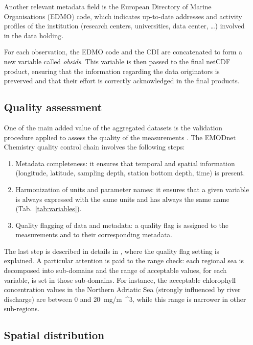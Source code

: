 \documentclass[essd, manuscript]{copernicus}
\begin{document}
Another relevant metadata field is the European Directory of Marine Organisations (EDMO) code, which indicates up-to-date addresses and activity profiles of the institution (research centers, universities, data center, \ldots) involved in the data holding. 

For each observation, the EDMO code and the CDI are concatenated to form a new variable called \textit{obsids}. This variable is then passed to the final netCDF product, ensuring that the information regarding the data originators is preverved and that their effort is correctly acknowledged in the final products. 

\subsection{Quality assessment\label{sec:dataqualitycontrol}}

One of the main added value of the aggregated datasets is the validation procedure applied to assess the quality of the measurements \citep{Barth2015,Lipizer2021,Lipizer2023}. The EMODnet Chemistry quality control chain involves the following steps:
\begin{enumerate}
\item Metadata completeness: it ensures that temporal and spatial information (longitude, latitude, sampling depth, station bottom depth, time) is present.
\item Harmonization of units and parameter names: it ensures that a given variable is always expressed with the same units and has always the same name (Tab.~\ref{tab:variables}). 
\item Quality flagging of data and metadata: a quality flag is assigned to the measurements and to their corresponding metadata.
\end{enumerate} 
The last step is described in details in \citet{Lipizer2023}, where the quality flag setting is explained. A particular attention is paid to the range check: each regional sea is decomposed into sub-domains and the range of acceptable values, for each variable, is set in those sub-domains. For instance, the acceptable chlorophyll concentration values in the Northern Adriatic Sea (strongly influenced by river discharge) are between 0 and 20~\unit{mg/m{^3}}, while this range is narrower in other sub-regions.

\subsection{Spatial distribution}
\end{document}
